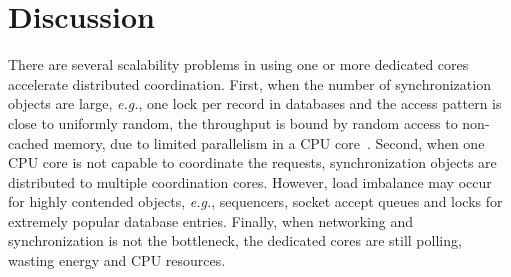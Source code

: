 \section{Discussion}
\label{sec:discussion}

There are several scalability problems in using one or more dedicated cores accelerate distributed coordination.
First, when the number of synchronization objects are large, \textit{e.g.}, one lock per record in databases and the access pattern is close to uniformly random, the throughput is bound by random access to non-cached memory, due to limited parallelism in a CPU core~\cite{lim2014mica}.
Second, when one CPU core is not capable to coordinate the requests, synchronization objects are distributed to multiple coordination cores. However, load imbalance may occur for highly contended objects, \textit{e.g.}, sequencers, socket accept queues and locks for extremely popular database entries.
Finally, when networking and synchronization is not the bottleneck, the dedicated cores are still polling, wasting energy and CPU resources.
